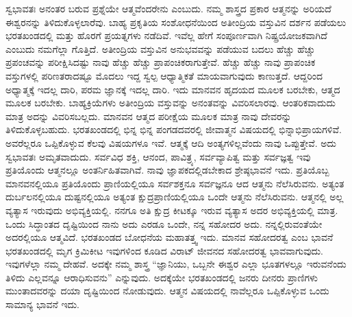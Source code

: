 ಸ್ವಭಾವತಃ ಅನಂತರ ಬರುವ ಪ್ರಶ್ನೆಯೇ ಆತ್ಮವೆಂದರೇನು ಎಂಬುದು. ನಮ್ಮ ಶಾಸ್ತ್ರದ ಪ್ರಕಾರ ಆತ್ಮನನ್ನು ಅರಿಯದೆ ಈಶ್ವರನನ್ನು ತಿಳಿದುಕೊಳ್ಳಲಾರೆವು. ಬಾಹ್ಯ ಪ್ರಕೃತಿಯ ಸಂಶೋಧನೆಯಿಂದ ಅತೀಂದ್ರಿಯ ವಸ್ತುವಿನ ದರ್ಶನ ಪಡೆಯಲು ಭರತಖಂಡದಲ್ಲಿ ಮತ್ತು ಹೊರಗೆ ಪ್ರಯತ್ನಗಳು ನಡೆದಿವೆ. ಇವೆಲ್ಲ ಹೇಗೆ ಸಂಪೂರ್ಣವಾಗಿ ನಿಷ್ಪ್ರಯೋಜಕವಾಗಿದೆ ಎಂಬುದು ನಮಗೆಲ್ಲಾ ಗೊತ್ತಿದೆ. ಅತೀಂದ್ರಿಯ ವಸ್ತುವಿನ ಅನುಭವವನ್ನು ಪಡೆಯುವ ಬದಲು ಹೆಚ್ಚು ಹೆಚ್ಚು ಪ್ರಪಂಚವನ್ನು ಪರೀಕ್ಷಿಸಿದಷ್ಟು ನಾವು ಹೆಚ್ಚು ಹೆಚ್ಚು ಪ್ರಾಪಂಚಿಕರಾಗುತ್ತೇವೆ. ಹೆಚ್ಚು ಹೆಚ್ಚು ನಾವು ಪ್ರಾಪಂಚಿಕ ವಸ್ತುಗಳಲ್ಲಿ ಪರಿಣತರಾದಷ್ಟೂ ಮೊದಲು ಇದ್ದ ಸ್ವಲ್ಪ ಆಧ್ಯಾತ್ಮಿಕತೆ ಮಾಯವಾಗುವುದು ಕಾಣುತ್ತದೆ. ಆದ್ದರಿಂದ ಅಧ್ಯಾತ್ಮಕ್ಕೆ ಇದಲ್ಲ ದಾರಿ, ಪರಮ ಜ್ಞಾನಕ್ಕೆ ಇದಲ್ಲ ದಾರಿ. ಇದು ಮಾನವನ ಹೃದಯದ ಮೂಲಕ ಬರಬೇಕು, ಆತ್ಮದ ಮೂಲಕ ಬರಬೇಕು. ಬಾಹ್ಯಕ್ರಿಯೆಗಳು ಅತೀಂದ್ರಿಯ ವಸ್ತುವನ್ನು ಅನಂತವನ್ನು ವಿವರಿಸಲಾರವು. ಆಂತರಿಕವಾದುದು ಮಾತ್ರ ಅದನ್ನು ವಿವರಿಸಬಲ್ಲದು. ಮಾನವನ ಆತ್ಮದ ಪರೀಕ್ಷೆಯ ಮೂಲಕ ಮಾತ್ರ ನಾವು ದೇವರನ್ನು ತಿಳಿದುಕೊಳ್ಳಬಹುದು. ಭರತಖಂಡದಲ್ಲಿ ಭಿನ್ನ ಭಿನ್ನ ಪಂಗಡದವರಲ್ಲಿ ಜೀವಾತ್ಮನ ವಿಷಯದಲ್ಲಿ ಭಿನ್ನಾಭಿಪ್ರಾಯಗಳಿವೆ. ಅವರೆಲ್ಲರೂ ಒಪ್ಪಿಕೊಳ್ಳುವ ಕೆಲವು ವಿಷಯಗಳೂ ಇವೆ. ಆತ್ಮಕ್ಕೆ ಆದಿ ಅಂತ್ಯಗಳಿಲ್ಲವೆಂದು ನಾವು ಒಪ್ಪುತ್ತೇವೆ. ಅದು ಸ್ವಭಾವತಃ ಅಮೃತವಾದುದು. ಸರ್ವವಿಧ ಶಕ್ತಿ, ಆನಂದ, ಪಾವಿತ್ರ್ಯ, ಸರ್ವವ್ಯಾಪಿತ್ವ ಮತ್ತು ಸರ್ವಜ್ಞತ್ವ ಇವು ಪ್ರತಿಯೊಂದು ಆತ್ಮನಲ್ಲೂ ಅಂತರ್ನಿಹಿತವಾಗಿವೆ. ನಾವು ಜ್ಞಾಪಕದಲ್ಲಿಡಬೇಕಾದ ಶ್ರೇಷ್ಠಭಾವನೆ ಇದು. ಪ್ರತಿಯೊಬ್ಬ ಮಾನವನಲ್ಲಿಯೂ ಪ್ರತಿಯೊಂದು ಪ್ರಾಣಿಯಲ್ಲಿಯೂ ಸರ್ವಶಕ್ತನೂ ಸರ್ವಜ್ಞನೂ ಆದ ಆತ್ಮನು ನೆಲೆಸಿರುವನು. ಅತ್ಯಂತ ದುರ್ಬಲನಲ್ಲಿಯೂ ದುಷ್ಟನಲ್ಲಿಯೂ ಅತ್ಯಂತ ಕ್ಷುದ್ರಪ್ರಾಣಿಯಲ್ಲಿಯೂ ಒಂದೇ ಆತ್ಮನು ನೆಲೆಸಿರುವನು. ಆತ್ಮನಲ್ಲಿ ಅಲ್ಲ ವ್ಯತ್ಯಾಸ ಇರುವುದು ಅಭಿವ್ಯಕ್ತಿಯಲ್ಲಿ. ನನಗೂ ಅತಿ ಕ್ಷುದ್ರ ಕೀಟಕ್ಕೂ ಇರುವ ವ್ಯತ್ಯಾಸ ಅದರ ಅಭಿವ್ಯಕ್ತಿಯಲ್ಲಿ ಮಾತ್ರ. ಒಂದು ಸಿದ್ಧಾಂತದ ದೃಷ್ಟಿಯಿಂದ ನಾನು ಅದು ಎರಡೂ ಒಂದೇ, ನನ್ನ ಸಹೋದರ ಅದು. ನನ್ನಲ್ಲಿರುವಂತೆಯೇ ಅದರಲ್ಲಿಯೂ ಆತ್ಮವಿದೆ. ಭರತಖಂಡದ ಬೋಧನೆಯ ಮಹಾತತ್ತ್ವ ಇದು. ಮಾನವ ಸಹೋದರತ್ವ ಎಂಬ ಭಾವನೆ ಭರತಖಂಡದಲ್ಲಿ ಮೃಗ ಕ್ರಿಮಿಕೀಟ ಇವುಗಳಿಂದ ಕೂಡಿದ ವಿರಾಟ್​ ಜೀವನದ ಸಹೋದರತ್ವ ಭಾವವಾಗುವುದು. ಇವುಗಳೆಲ್ಲಾ ನಮ್ಮ ದೇಹವೆ. ಅದಕ್ಕೇ ನಮ್ಮ ಶಾಸ್ತ್ರ “ಜ್ಞಾನಿಯು, ಒಬ್ಬನೇ ಈಶ್ವರ ಎಲ್ಲಾ ಭೂತಗಳಲ್ಲೂ ಇರುವನೆಂದು ತಿಳಿದು ಎಲ್ಲವನ್ನೂ ಆರಾಧಿಸುವನು” ಎನ್ನುವುದು. ಅದಕ್ಕೆಯೇ ಭರತಖಂಡದಲ್ಲಿ ಜನರು ದೀನರು ಪ್ರಾಣಿಗಳು ಮುಂತಾದವರನ್ನು ದಯಾ ದೃಷ್ಟಿಯಿಂದ ನೋಡುವುದು. ಆತ್ಮನ ವಿಷಯದಲ್ಲಿ ನಾವೆಲ್ಲರೂ ಒಪ್ಪಿಕೊಳ್ಳುವ ಒಂದು ಸಾಮಾನ್ಯ ಭಾವನೆ ಇದು.

